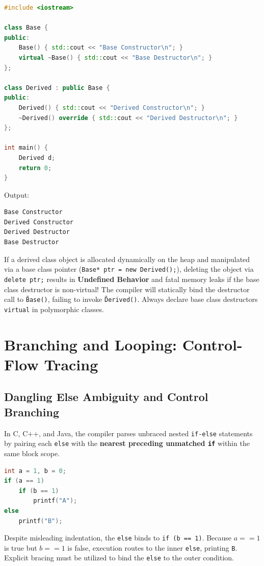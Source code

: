 \begin{lstlisting}[language=C++]
#include <iostream>

class Base {
public:
    Base() { std::cout << "Base Constructor\n"; }
    virtual ~Base() { std::cout << "Base Destructor\n"; }
};

class Derived : public Base {
public:
    Derived() { std::cout << "Derived Constructor\n"; }
    ~Derived() override { std::cout << "Derived Destructor\n"; }
};

int main() {
    Derived d;
    return 0;
}
\end{lstlisting}
Output:
\begin{lstlisting}
Base Constructor
Derived Constructor
Derived Destructor
Base Destructor
\end{lstlisting}

\begin{tcolorbox}[colback=codebg,colframe=quotetext,title=\textbf{Exam Trap: The Absolute Necessity of Virtual Destructors}]
If a derived class object is allocated dynamically on the heap and manipulated via a base class pointer (\texttt{Base* ptr = new Derived();}), deleting the object via \texttt{delete ptr;} results in \textbf{Undefined Behavior} and fatal memory leaks if the base class destructor is non-virtual! The compiler will statically bind the destructor call to \texttt{\~Base()}, failing to invoke \texttt{\~Derived()}. Always declare base class destructors \texttt{virtual} in polymorphic classes.
\end{tcolorbox}

\section{Branching and Looping: Control-Flow Tracing}
\label{sec:branching_looping_tracing}

\subsection{Dangling Else Ambiguity and Control Branching}
In C, C++, and Java, the compiler parses unbraced nested \texttt{if-else} statements by pairing each \texttt{else} with the \textbf{nearest preceding unmatched \texttt{if}} within the same block scope.

\begin{lstlisting}[language=C]
int a = 1, b = 0;
if (a == 1)
    if (b == 1)
        printf("A");
else
    printf("B");
\end{lstlisting}
Despite misleading indentation, the \texttt{else} binds to \texttt{if (b == 1)}. Because $a == 1$ is true but $b == 1$ is false, execution routes to the inner \texttt{else}, printing \texttt{B}. Explicit bracing must be utilized to bind the \texttt{else} to the outer condition.

